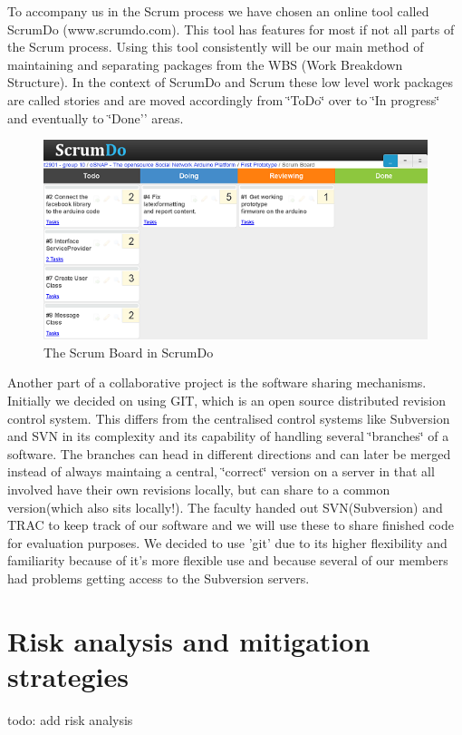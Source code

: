 To accompany us in the Scrum process we have chosen an online tool
called ScrumDo (www.scrumdo.com). This tool has features for most
if not all parts of the Scrum process. Using this tool consistently
	will be our main method of maintaining and separating packages from
	the WBS (Work Breakdown Structure). In the context of ScrumDo and
	Scrum these low level work packages are called stories and are moved
	accordingly from \char`\"{}ToDo\char`\"{} over to \char`\"{}In progress\char`\"{}
	and eventually to \char`\"{}Done'' areas.
	
	\begin{figure}
	\centering \includegraphics{img/management-scrumdo} \caption{The Scrum Board in ScrumDo}
	
	
	\label{fig:management-scrumdo}
	\end{figure}
	
	
	Another part of a collaborative project is the software sharing mechanisms.
	Initially we decided on using GIT, which is an open source distributed
	revision control system. This differs from the centralised control
	systems like Subversion and SVN in its complexity and its capability
	of handling several \char`\"{}branches\char`\"{} of a software. The
	branches can head in different directions and can later be merged
	instead of always maintaing a central, \char`\"{}correct\char`\"{}
	version on a server in that all involved have their own revisions
	locally, but can share to a common version(which also sits locally!).
	The faculty handed out SVN(Subversion) and TRAC to keep track of our
	software and we will use these to share finished code for evaluation
	purposes. We decided to use 'git' due to its higher flexibility and
	familiarity because of it's more flexible use and because several
	of our members had problems getting access to the Subversion servers.

\section{Risk analysis and mitigation strategies}
todo: add risk analysis